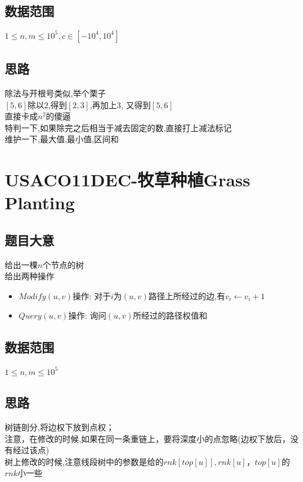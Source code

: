 \documentclass{ctexart}
\numberwithin{equation}{section}
\begin{document}
\begin{flushleft}
  \subsection{数据范围}
  $1\le n,m\le 10^5,c\in [-10^4,10^4]$ \\
  \subsection{思路}
  除法与开根号类似,举个栗子\\
  $[5,6]$除以$2$,得到$[2,3]$,再加上3, 又得到$[5,6]$\\
  直接卡成$n^2$的傻逼\\
  特判一下,如果除完之后相当于减去固定的数,直接打上减法标记 \\
  维护一下,最大值,最小值,区间和\\
  \newpage

  \section{USACO11DEC-牧草种植Grass Planting}
  \subsection{题目大意}
  给出一棵$n$个节点的树\\
  给出两种操作
  \begin{itemize}
  \item $Modify(u,v)$操作:
    对于$i$为$(u,v)$路径上所经过的边,有$v_i\leftarrow v_i+1$ \\
  \item $Query(u,v)$操作: 询问$(u,v)$所经过的路径权值和\\
  \end{itemize}
  \subsection{数据范围}
  $1\le n,m\le 10^5$ \\
  \subsection{思路}
  树链剖分,将边权下放到点权；\\
  注意，在修改的时候,如果在同一条重链上，要将深度小的点忽略(边权下放后，没有经过该点)\\
  树上修改的时候,注意线段树中的参数是给的$rnk[top[u]],rnk[u]$，$top[u]$的$rnk$小一些\\
  \newpage


\end{flushleft}
\end{document}
